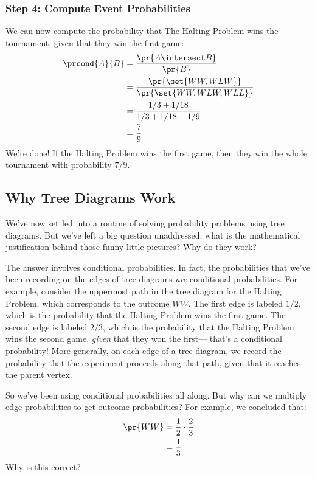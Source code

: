 \subsubsection*{Step 4: Compute Event Probabilities}

We can now compute the probability that The Halting Problem wins the
tournament, given that they win the first game:
%
\begin{align*}
\prcond{A}{B}
    & = \frac{\pr{A \intersect B}}{\pr{B}} \\
    & = \frac{\pr{\set{WW, WLW}}}{\pr{\set{WW, WLW, WLL}}} \\
    & = \frac{1/3 + 1/18}{1/3 + 1/18 + 1/9} \\
    & = \frac{7}{9}
\end{align*}
%
We're done!  If the Halting Problem wins the first game, then they win
the whole tournament with probability $7 / 9$.  


\subsection{Why Tree Diagrams Work}\label{product_rule_subsec}

We've now settled into a routine of solving probability problems using
tree diagrams.  But we've left a big question unaddressed: what is the
mathematical justification behind those funny little pictures?  Why do
they work?

The answer involves conditional probabilities.  In fact, the
probabilities that we've been recording on the edges of tree diagrams
\textit{are} conditional probabilities.  For example, consider the
uppermost path in the tree diagram for the Halting Problem, which
corresponds to the outcome $WW$.  The first edge is labeled $1/2$,
which is the probability that the Halting Problem wins the first game.
The second edge is labeled $2 / 3$, which is the probability that the
Halting Problem wins the second game, \textit{given} that they won the
first--- that's a conditional probability!  More generally, on each
edge of a tree diagram, we record the probability that the experiment
proceeds along that path, given that it reaches the parent vertex.

So we've been using conditional probabilities all along.  But why can
we multiply edge probabilities to get outcome probabilities?  For
example, we concluded that:
%
\begin{align*}
\pr{WW} & = \frac{1}{2} \cdot \frac{2}{3} \\
	& = \frac{1}{3}
\end{align*}
%
Why is this correct?

